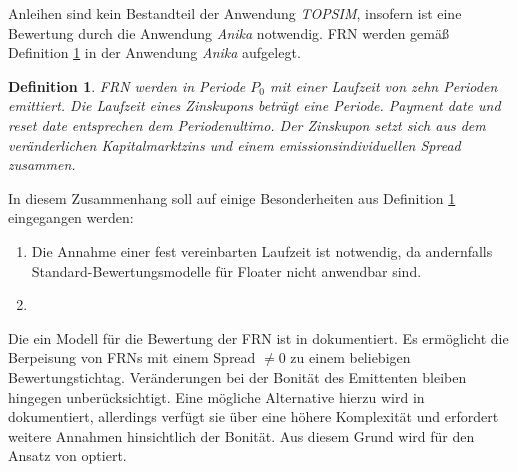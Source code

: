 \documentclass[12pt, a4paper]{article}
\theoremstyle{plain}
\newtheorem{definition}{Definition}
\begin{document}
Anleihen sind kein Bestandteil der Anwendung \textit{TOPSIM}, insofern ist eine Bewertung durch die Anwendung \textit{Anika} notwendig. \gls{FRN} werden gemäß Definition \ref{def:floater} in der Anwendung \textit{Anika} aufgelegt.

\begin{definition}
	\label{def:floater}
	\gls{FRN} werden in Periode $P_0$ mit einer Laufzeit von zehn Perioden emittiert. Die Laufzeit eines Zinskupons beträgt eine Periode. \textit{Payment date} und \textit{reset date} entsprechen dem Periodenultimo. Der Zinskupon setzt sich aus dem veränderlichen Kapitalmarktzins und einem emissionsindividuellen Spread zusammen.
\end{definition}

In diesem Zusammenhang soll auf einige Besonderheiten aus Definition \ref{def:floater} eingegangen werden:
\begin{enumerate}
	\item Die Annahme einer fest vereinbarten Laufzeit ist notwendig, da andernfalls Standard-Bewertungsmodelle für Floater nicht anwendbar sind.
	\item 
\end{enumerate}







Die  ein Modell für die Bewertung der \gls{FRN} ist in \textcite[][S.~31~f.]{alexander_market_2008} dokumentiert. 
Es ermöglicht die Berpeisung von \glspl{FRN} mit einem Spread $\neq0$ zu einem beliebigen Bewertungstichtag.
Veränderungen bei der Bonität des Emittenten bleiben hingegen unberücksichtigt. 
Eine mögliche Alternative hierzu wird in \textcite[][S.~65~f.]{schonbucher_credit_2003} dokumentiert, allerdings verfügt sie über eine höhere Komplexität und erfordert weitere Annahmen hinsichtlich der Bonität. Aus diesem Grund wird für den Ansatz von \autocite[][S.~31~f.]{alexander_market_2008} optiert.
\end{document}
